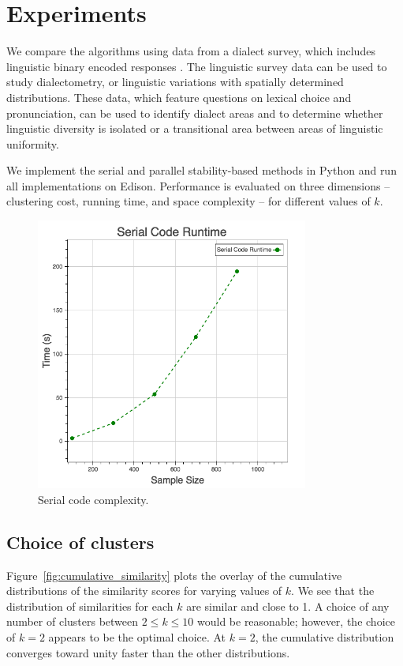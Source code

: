 \documentclass[10pt,twocolumn,letterpaper]{article}
\begin{document}
\section{Experiments} \label{section:experiments}

We compare the algorithms using data from a dialect survey, which includes linguistic binary encoded responses \cite{vaux2003}. The linguistic survey data can be used to study dialectometry, or linguistic variations with spatially determined distributions. These data, which feature questions on lexical choice and pronunciation, can be used to identify dialect areas and to determine whether linguistic diversity is isolated or a transitional area between areas of linguistic uniformity. 

We implement the serial and parallel stability-based methods in Python and run all implementations on Edison. Performance is evaluated on three dimensions -- clustering cost, running time, and space complexity -- for different values of $k$.

\begin{figure}[htbp] 
   \centering
   \includegraphics[width=0.8\textwidth]{./figure/serial.png}
   \caption{Serial code complexity.}
   \label{fig:serial}
\end{figure}

\subsection{Choice of clusters} 

Figure~\ref{fig:cumulative_similarity} plots the overlay of the cumulative distributions of the similarity scores for varying values of $k$. We see that the distribution of similarities for each $k$ are similar and close to 1. A choice of any number of clusters between $2 \leq k \leq 10$ would be reasonable;  however, the choice of $k=2$ appears to be the optimal choice. At $k=2$, the cumulative distribution converges toward unity faster than the other distributions. 
\end{document}
